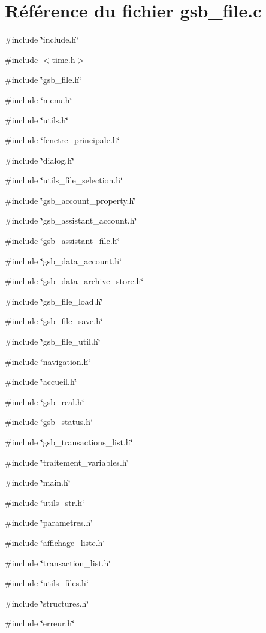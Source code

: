 \section{Référence du fichier gsb\_\-file.c}
\label{gsb__file_8c}
{\ttfamily \#include \char`\"{}include.h\char`\"{}}\par
{\ttfamily \#include $<$time.h$>$}\par
{\ttfamily \#include \char`\"{}gsb\_\-file.h\char`\"{}}\par
{\ttfamily \#include \char`\"{}menu.h\char`\"{}}\par
{\ttfamily \#include \char`\"{}utils.h\char`\"{}}\par
{\ttfamily \#include \char`\"{}fenetre\_\-principale.h\char`\"{}}\par
{\ttfamily \#include \char`\"{}dialog.h\char`\"{}}\par
{\ttfamily \#include \char`\"{}utils\_\-file\_\-selection.h\char`\"{}}\par
{\ttfamily \#include \char`\"{}gsb\_\-account\_\-property.h\char`\"{}}\par
{\ttfamily \#include \char`\"{}gsb\_\-assistant\_\-account.h\char`\"{}}\par
{\ttfamily \#include \char`\"{}gsb\_\-assistant\_\-file.h\char`\"{}}\par
{\ttfamily \#include \char`\"{}gsb\_\-data\_\-account.h\char`\"{}}\par
{\ttfamily \#include \char`\"{}gsb\_\-data\_\-archive\_\-store.h\char`\"{}}\par
{\ttfamily \#include \char`\"{}gsb\_\-file\_\-load.h\char`\"{}}\par
{\ttfamily \#include \char`\"{}gsb\_\-file\_\-save.h\char`\"{}}\par
{\ttfamily \#include \char`\"{}gsb\_\-file\_\-util.h\char`\"{}}\par
{\ttfamily \#include \char`\"{}navigation.h\char`\"{}}\par
{\ttfamily \#include \char`\"{}accueil.h\char`\"{}}\par
{\ttfamily \#include \char`\"{}gsb\_\-real.h\char`\"{}}\par
{\ttfamily \#include \char`\"{}gsb\_\-status.h\char`\"{}}\par
{\ttfamily \#include \char`\"{}gsb\_\-transactions\_\-list.h\char`\"{}}\par
{\ttfamily \#include \char`\"{}traitement\_\-variables.h\char`\"{}}\par
{\ttfamily \#include \char`\"{}main.h\char`\"{}}\par
{\ttfamily \#include \char`\"{}utils\_\-str.h\char`\"{}}\par
{\ttfamily \#include \char`\"{}parametres.h\char`\"{}}\par
{\ttfamily \#include \char`\"{}affichage\_\-liste.h\char`\"{}}\par
{\ttfamily \#include \char`\"{}transaction\_\-list.h\char`\"{}}\par
{\ttfamily \#include \char`\"{}utils\_\-files.h\char`\"{}}\par
{\ttfamily \#include \char`\"{}structures.h\char`\"{}}\par
{\ttfamily \#include \char`\"{}erreur.h\char`\"{}}\par
